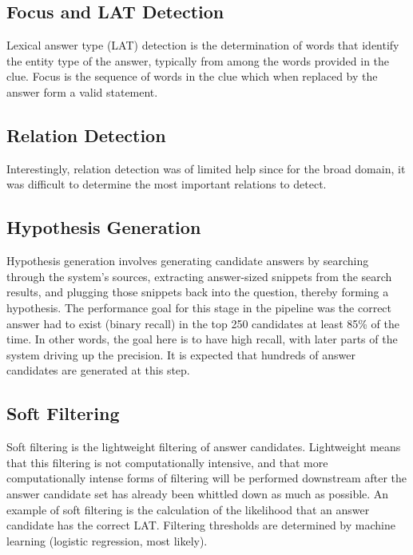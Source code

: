\subsection{Focus and LAT Detection}

Lexical answer type (LAT) detection is the determination of words that identify the entity type of the answer, typically from among the words provided in the clue.  Focus is the sequence of words in the clue which when replaced by the answer form a valid statement.

\subsection{Relation Detection}

Interestingly, relation detection was of limited help since for the broad domain, it was difficult to determine the most important relations to detect.

\subsection{Hypothesis Generation}

Hypothesis generation involves generating candidate answers by searching through the system’s sources, extracting answer-sized snippets from the search results, and plugging those snippets back into the question, thereby forming a hypothesis.  The performance goal for this stage in the pipeline was the correct answer had to exist (binary recall) in the top 250 candidates at least 85\% of the time.  In other words, the goal here is to have high recall, with later parts of the system driving up the precision.  It is expected that hundreds of answer candidates are generated at this step.

\subsection{Soft Filtering}

Soft filtering is the lightweight filtering of answer candidates.  Lightweight means that this filtering is not computationally intensive, and that more computationally intense forms of filtering will be performed downstream after the answer candidate set has already been whittled down as much as possible.  An example of soft filtering is the calculation of the likelihood that an answer candidate has the correct LAT.
Filtering thresholds are determined by machine learning (logistic regression, most likely).

